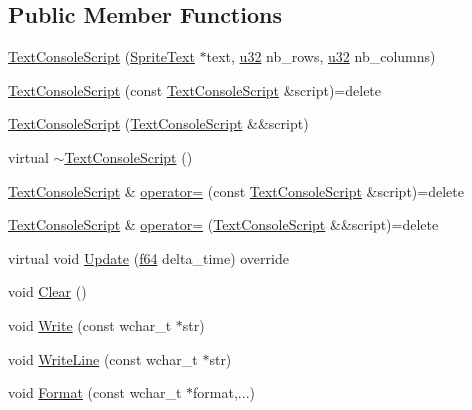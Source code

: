 \subsection*{Public Member Functions}
\begin{DoxyCompactItemize}
\item 
\hyperlink{classmage_1_1_text_console_script_a5917f600c63df4bcead7cf3513f5c0cc}{Text\+Console\+Script} (\hyperlink{classmage_1_1_sprite_text}{Sprite\+Text} $\ast$text, \hyperlink{namespacemage_af2b398bf98eb10351f49cad73fe2cc73}{u32} nb\+\_\+rows, \hyperlink{namespacemage_af2b398bf98eb10351f49cad73fe2cc73}{u32} nb\+\_\+columns)
\item 
\hyperlink{classmage_1_1_text_console_script_ad31e204ced04dc42fb98397df6015198}{Text\+Console\+Script} (const \hyperlink{classmage_1_1_text_console_script}{Text\+Console\+Script} \&script)=delete
\item 
\hyperlink{classmage_1_1_text_console_script_a6d245efb103011f1b2e2c43c590c22bf}{Text\+Console\+Script} (\hyperlink{classmage_1_1_text_console_script}{Text\+Console\+Script} \&\&script)
\item 
virtual \hyperlink{classmage_1_1_text_console_script_a3269d6b792053d4ce13d63103ca5b4e9}{$\sim$\+Text\+Console\+Script} ()
\item 
\hyperlink{classmage_1_1_text_console_script}{Text\+Console\+Script} \& \hyperlink{classmage_1_1_text_console_script_af7da3f0735f72fed0d6fc265b6ae07e9}{operator=} (const \hyperlink{classmage_1_1_text_console_script}{Text\+Console\+Script} \&script)=delete
\item 
\hyperlink{classmage_1_1_text_console_script}{Text\+Console\+Script} \& \hyperlink{classmage_1_1_text_console_script_a2a14c6a981fe7ded4e7a4fa5480ac6cb}{operator=} (\hyperlink{classmage_1_1_text_console_script}{Text\+Console\+Script} \&\&script)=delete
\item 
virtual void \hyperlink{classmage_1_1_text_console_script_ae26b3b5bd9ca755295d50d594d549abb}{Update} (\hyperlink{namespacemage_ab935747c6941320bd6214b5a5f265b09}{f64} delta\+\_\+time) override
\item 
void \hyperlink{classmage_1_1_text_console_script_aff5acec462f505735720a17d541ba912}{Clear} ()
\item 
void \hyperlink{classmage_1_1_text_console_script_a659586a498f8ff0f55aa2a3f25f0828b}{Write} (const wchar\+\_\+t $\ast$str)
\item 
void \hyperlink{classmage_1_1_text_console_script_a24fe33795c69e70d07a680826cfafcc1}{Write\+Line} (const wchar\+\_\+t $\ast$str)
\item 
void \hyperlink{classmage_1_1_text_console_script_a4d9ba97e4ff4ad5390b20e5523a20e92}{Format} (const wchar\+\_\+t $\ast$format,...)
\end{DoxyCompactItemize}
